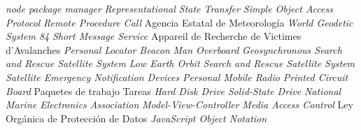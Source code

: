 {\begin{acronym}[XXXXXXXX]
  	   {\textit{node package manager}}
  	   {\textit{Representational State Transfer}}
  	   {\textit{Simple Object Access Protocol}}
  	   {\textit{Remote Procedure Call}}
  	   {Agencia Estatal de Meteorología}
      {\textit{World Geodetic System 84}}
         {\textit{Short Message Service}}
        {Appareil de Recherche de Victimes d'Avalanches}
   	   {\textit{Personal Locator Beacon}}
         {\textit{Man Overboard}}
      {\textit{Geosynchronous Search and Rescue Satellite System}}
      {\textit{Low Earth Orbit Search and Rescue Satellite System}}
  	   {\textit{Satellite Emergency Notification Devices}}
         {\textit{Personal Mobile Radio}}
  	   {\textit{Printed Circuit Board}}
   	   {Paquetes de trabajo}
  		   {Tareas}
  	   {\textit{Hard Disk Drive}}
  	   {\textit{Solid-State Drive}}
        {\textit{National Marine Electronics Association}}
  	   {\textit{Model-View-Controller}}
  	   {\textit{Media Access Control}}
  	   {Ley Orgánica de Protección de Datos}
        {\textit{JavaScript Object Notation}}
\end{acronym}
}




